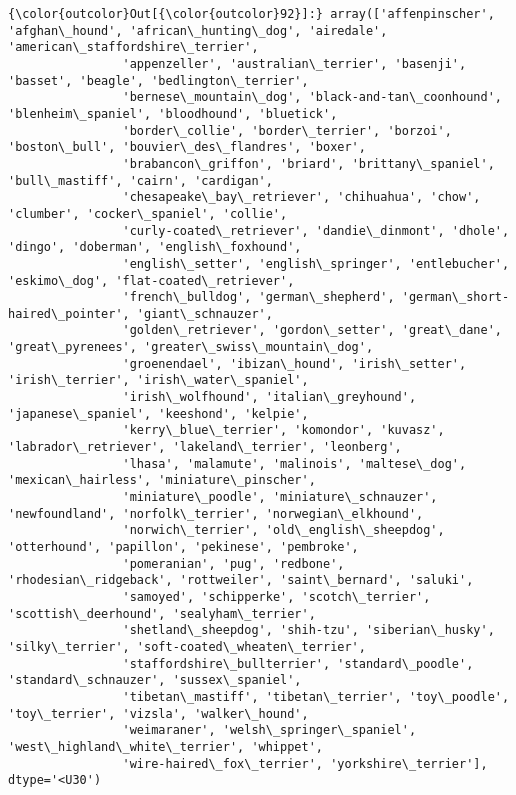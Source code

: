 \documentclass[11pt]{article}
\begin{document}
\begin{Verbatim}[commandchars=\\\{\}]
{\color{outcolor}Out[{\color{outcolor}92}]:} array(['affenpinscher', 'afghan\_hound', 'african\_hunting\_dog', 'airedale', 'american\_staffordshire\_terrier',
                'appenzeller', 'australian\_terrier', 'basenji', 'basset', 'beagle', 'bedlington\_terrier',
                'bernese\_mountain\_dog', 'black-and-tan\_coonhound', 'blenheim\_spaniel', 'bloodhound', 'bluetick',
                'border\_collie', 'border\_terrier', 'borzoi', 'boston\_bull', 'bouvier\_des\_flandres', 'boxer',
                'brabancon\_griffon', 'briard', 'brittany\_spaniel', 'bull\_mastiff', 'cairn', 'cardigan',
                'chesapeake\_bay\_retriever', 'chihuahua', 'chow', 'clumber', 'cocker\_spaniel', 'collie',
                'curly-coated\_retriever', 'dandie\_dinmont', 'dhole', 'dingo', 'doberman', 'english\_foxhound',
                'english\_setter', 'english\_springer', 'entlebucher', 'eskimo\_dog', 'flat-coated\_retriever',
                'french\_bulldog', 'german\_shepherd', 'german\_short-haired\_pointer', 'giant\_schnauzer',
                'golden\_retriever', 'gordon\_setter', 'great\_dane', 'great\_pyrenees', 'greater\_swiss\_mountain\_dog',
                'groenendael', 'ibizan\_hound', 'irish\_setter', 'irish\_terrier', 'irish\_water\_spaniel',
                'irish\_wolfhound', 'italian\_greyhound', 'japanese\_spaniel', 'keeshond', 'kelpie',
                'kerry\_blue\_terrier', 'komondor', 'kuvasz', 'labrador\_retriever', 'lakeland\_terrier', 'leonberg',
                'lhasa', 'malamute', 'malinois', 'maltese\_dog', 'mexican\_hairless', 'miniature\_pinscher',
                'miniature\_poodle', 'miniature\_schnauzer', 'newfoundland', 'norfolk\_terrier', 'norwegian\_elkhound',
                'norwich\_terrier', 'old\_english\_sheepdog', 'otterhound', 'papillon', 'pekinese', 'pembroke',
                'pomeranian', 'pug', 'redbone', 'rhodesian\_ridgeback', 'rottweiler', 'saint\_bernard', 'saluki',
                'samoyed', 'schipperke', 'scotch\_terrier', 'scottish\_deerhound', 'sealyham\_terrier',
                'shetland\_sheepdog', 'shih-tzu', 'siberian\_husky', 'silky\_terrier', 'soft-coated\_wheaten\_terrier',
                'staffordshire\_bullterrier', 'standard\_poodle', 'standard\_schnauzer', 'sussex\_spaniel',
                'tibetan\_mastiff', 'tibetan\_terrier', 'toy\_poodle', 'toy\_terrier', 'vizsla', 'walker\_hound',
                'weimaraner', 'welsh\_springer\_spaniel', 'west\_highland\_white\_terrier', 'whippet',
                'wire-haired\_fox\_terrier', 'yorkshire\_terrier'], dtype='<U30')
\end{Verbatim}
            
\end{document}

